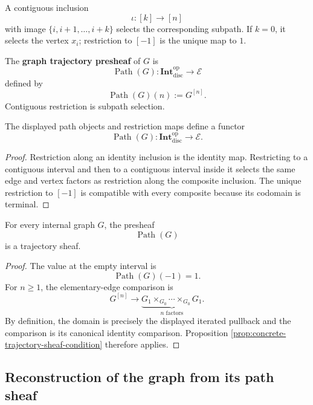 A contiguous inclusion
\[
    \iota:[k]\to[n]
\]
with image \(\{i,i+1,\ldots,i+k\}\) selects the corresponding subpath. If
\(k=0\), it selects the vertex \(x_i\); restriction to \([-1]\) is the
unique map to \(1\).

\begin{definition}
\label{def:graph-trajectory-presheaf}
The \textbf{graph trajectory presheaf} of \(G\) is
\[
    \operatorname{Path}(G):
    \mathbf{Int}_{\mathrm{disc}}^{\mathrm{op}}
    \to
    \mathcal E
\]
defined by
\[
    \operatorname{Path}(G)(n):=G^{[n]}.
\]
Contiguous restriction is subpath selection.
\end{definition}

\begin{lemma}
\label{lem:functoriality-graph-trajectories}
The displayed path objects and restriction maps define a functor
\[
    \operatorname{Path}(G):
    \mathbf{Int}_{\mathrm{disc}}^{\mathrm{op}}
    \to
    \mathcal E.
\]
\end{lemma}

\begin{proof}
Restriction along an identity inclusion is the identity map. Restricting to a
contiguous interval and then to a contiguous interval inside it selects the
same edge and vertex factors as restriction along the composite inclusion.
The unique restriction to \([-1]\) is compatible with every composite because
its codomain is terminal.
\end{proof}

\begin{theorem}
\label{thm:temporal-gluing-graph-trajectories}
For every internal graph \(G\), the presheaf
\[
    \operatorname{Path}(G)
\]
is a trajectory sheaf.
\end{theorem}

\begin{proof}
The value at the empty interval is
\[
    \operatorname{Path}(G)(-1)=1.
\]
For \(n\geq1\), the elementary-edge comparison is
\[
    G^{[n]}
    \longrightarrow
    \underbrace{
    G_1\times_{G_0}\cdots\times_{G_0}G_1
    }_{n\text{ factors}}.
\]
By definition, the domain is precisely the displayed iterated pullback and
the comparison is its canonical identity comparison. Proposition
\ref{prop:concrete-trajectory-sheaf-condition} therefore applies.
\end{proof}

\subsection{Reconstruction of the graph from its path sheaf}
\label{subsec:reconstruction-underlying-graph}

